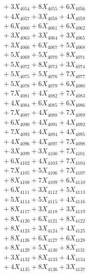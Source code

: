 \documentclass[a4paper,10pt]{article}
\begin{document}
{\begin{align}
&\;  + 3 X_{4054} + 8 X_{4055} + 6 X_{4056} \\[0.3ex]
&\;  + 4 X_{4057} + 3 X_{4058} + 4 X_{4059} \\[0.5ex]\allowbreak
&\;  + 6 X_{4060} + 6 X_{4061} + 6 X_{4062} \\[0.3ex]
&\;  + 3 X_{4063} + 3 X_{4064} + 3 X_{4065} \\[0.3ex]
&\;  + 3 X_{4066} + 6 X_{4067} + 5 X_{4068} \\[0.3ex]
&\;  + 5 X_{4069} + 5 X_{4070} + 8 X_{4071} \\[0.3ex]
&\;  + 5 X_{4072} + 8 X_{4073} + 3 X_{4074} \\[0.3ex]
&\;  + 5 X_{4075} + 5 X_{4076} + 7 X_{4077} \\[0.3ex]
&\;  + 5 X_{4078} + 6 X_{4079} + 6 X_{4080} \\[0.3ex]
&\;  + 7 X_{4081} + 4 X_{4082} + 7 X_{4083} \\[0.3ex]
&\;  + 4 X_{4084} + 6 X_{4085} + 6 X_{4086} \\[0.3ex]
&\;  + 7 X_{4087} + 4 X_{4088} + 7 X_{4089} \\[0.5ex]\allowbreak
&\;  + 6 X_{4090} + 4 X_{4091} + 4 X_{4092} \\[0.3ex]
&\;  + 7 X_{4093} + 4 X_{4094} + 4 X_{4095} \\[0.3ex]
&\;  + 4 X_{4096} + 4 X_{4097} + 7 X_{4098} \\[0.3ex]
&\;  + 3 X_{4099} + 3 X_{4100} + 7 X_{4101} \\[0.3ex]
&\;  + 6 X_{4102} + 4 X_{4103} + 7 X_{4104} \\[0.3ex]
&\;  + 7 X_{4105} + 5 X_{4106} + 7 X_{4107} \\[0.3ex]
&\;  + 8 X_{4108} + 7 X_{4109} + 6 X_{4110} \\[0.3ex]
&\;  + 6 X_{4111} + 3 X_{4112} + 5 X_{4113} \\[0.3ex]
&\;  + 5 X_{4114} + 5 X_{4115} + 4 X_{4116} \\[0.3ex]
&\;  + 8 X_{4117} + 3 X_{4118} + 3 X_{4119} \\[0.5ex]\allowbreak
&\;  + 8 X_{4120} + 6 X_{4121} + 8 X_{4122} \\[0.3ex]
&\;  + 8 X_{4123} + 3 X_{4124} + 4 X_{4125} \\[0.3ex]
&\;  + 8 X_{4126} + 6 X_{4127} + 6 X_{4128} \\[0.3ex]
&\;  + 8 X_{4129} + 5 X_{4130} + 8 X_{4131} \\[0.3ex]
&\;  + 3 X_{4132} + 8 X_{4133} + 4 X_{4134} \\[0.3ex]
&\;  + 4 X_{4135} + 8 X_{4136} + 3 X_{4137} \\[0.3ex]

\end{align}}
\end{document}
